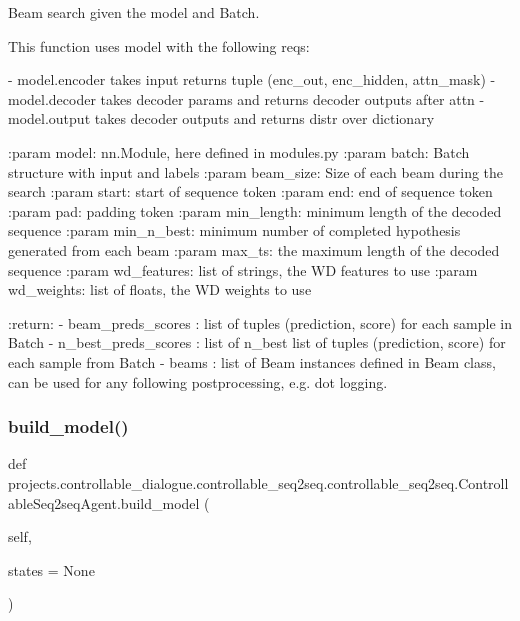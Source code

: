 \begin{DoxyVerb}Beam search given the model and Batch.

This function uses model with the following reqs:

- model.encoder takes input returns tuple (enc_out, enc_hidden, attn_mask)
- model.decoder takes decoder params and returns decoder outputs after attn
- model.output takes decoder outputs and returns distr over dictionary

:param model: nn.Module, here defined in modules.py
:param batch: Batch structure with input and labels
:param beam_size: Size of each beam during the search
:param start: start of sequence token
:param end: end of sequence token
:param pad: padding token
:param min_length: minimum length of the decoded sequence
:param min_n_best: minimum number of completed hypothesis generated
    from each beam
:param max_ts: the maximum length of the decoded sequence
:param wd_features: list of strings, the WD features to use
:param wd_weights: list of floats, the WD weights to use

:return:
    - beam_preds_scores : list of tuples (prediction, score) for each
      sample in Batch
    - n_best_preds_scores : list of n_best list of tuples (prediction,
      score) for each sample from Batch
    - beams : list of Beam instances defined in Beam class, can be used
      for any following postprocessing, e.g. dot logging.
\end{DoxyVerb}
 \mbox{\label{classprojects_1_1controllable__dialogue_1_1controllable__seq2seq_1_1controllable__seq2seq_1_1ControllableSeq2seqAgent_a4cecd20886ef127bbab1a756bb49fb75}} 
\subsubsection{\texorpdfstring{build\+\_\+model()}{build\_model()}}
{\footnotesize\ttfamily def projects.\+controllable\+\_\+dialogue.\+controllable\+\_\+seq2seq.\+controllable\+\_\+seq2seq.\+Controllable\+Seq2seq\+Agent.\+build\+\_\+model (\begin{DoxyParamCaption}\item[{}]{self,  }\item[{}]{states = {\ttfamily None} }\end{DoxyParamCaption})}

